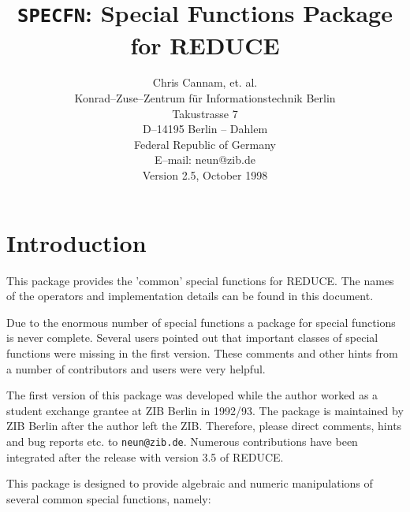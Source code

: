 \documentclass[11pt]{article}
\title{{\tt SPECFN}: Special Functions Package for REDUCE}
\date{}
\author{Chris Cannam, et. al.\\[0.05in]
Konrad--Zuse--Zentrum f\"ur Informationstechnik Berlin \\
Takustrasse 7\\
D--14195 Berlin -- Dahlem \\
Federal Republic of Germany \\[0.05in]
E--mail: neun@zib.de \\[0.05in]
Version 2.5, October 1998}
\begin{document}
\maketitle
{}
\section{Introduction}

This package provides the 'common' special functions for REDUCE.
The names of the operators and implementation details can be
found in this document.

Due to the enormous number of special functions
a package for special functions is never complete.
Several users pointed out that important classes
of special functions were missing in the first version.
These comments and other hints from a number of contributors
and users were very helpful.

The first version of this package was developed while the author
worked as a student exchange grantee at ZIB Berlin in 1992/93.
The package is maintained by ZIB Berlin after the author left the ZIB.
Therefore, please direct comments, hints and bug reports etc. to
{\tt neun@zib.de}.
Numerous contributions have been integrated after the release with
version 3.5 of REDUCE. 

This package is designed to provide algebraic and numeric manipulations of
several common special functions, namely:
\end{document}
